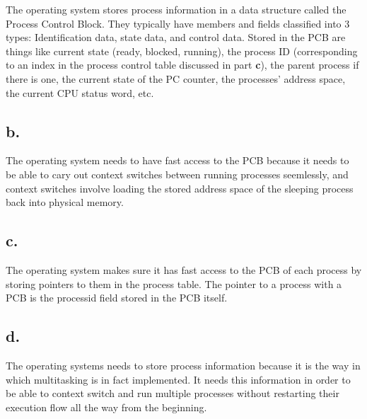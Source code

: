 \documentclass[11pt]{article} %
\begin{document}
The operating system stores process information in a data structure called the Process Control Block. They typically have members and fields classified into 3 types: Identification data, state data, and control data. Stored in the PCB are things like current state (ready, blocked, running), the process ID (corresponding to an index in the process control table discussed in part \textbf{c}), the parent process if there is one, the current state of the PC counter, the processes' address space, the current CPU status word, etc.

\subsection*{b.}

The operating system needs to have fast access to the PCB because it needs to be able to cary out context switches between running processes seemlessly, and context switches involve loading the stored address space of the sleeping process back into physical memory.

\subsection*{c.}

The operating system makes sure it has fast access to the PCB of each process by storing pointers to them in the process table. The pointer to a process with a PCB is the processid field stored in the PCB itself.

\subsection*{d.}

The operating systems needs to store process information because it is the way in which multitasking is in fact implemented. It needs this information in order to be able to context switch and run multiple processes without restarting their execution flow all the way from the beginning. 
\end{document}

